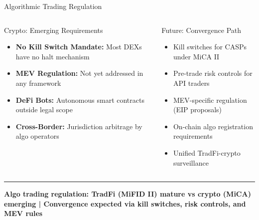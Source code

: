 \documentclass[8pt,aspectratio=169]{beamer}
\newcommand{\bottomnote}[1]{\vfill\vspace{-2mm}\textcolor{mllavender2}{\rule{\textwidth}{0.4pt}}\vspace{1mm}\footnotesize\textbf{#1}}
\begin{document}
\begin{frame}{Algorithmic Trading Regulation}
\begin{columns}[T]
\begin{block}{Crypto: Emerging Requirements}
\begin{itemize}
  \item \textbf{No Kill Switch Mandate:} Most DEXs have no halt mechanism
  \item \textbf{MEV Regulation:} Not yet addressed in any framework
  \item \textbf{DeFi Bots:} Autonomous smart contracts outside legal scope
  \item \textbf{Cross-Border:} Jurisdiction arbitrage by algo operators
\end{itemize}
\end{block}
\vspace{2mm}
\begin{block}{Future: Convergence Path}
\begin{itemize}\setlength{\itemsep}{3pt}
  \item Kill switches for CASPs under MiCA II
  \item Pre-trade risk controls for API traders
  \item MEV-specific regulation (EIP proposals)
  \item On-chain algo registration requirements
  \item Unified TradFi-crypto surveillance
\end{itemize}
\end{block}
\end{columns}
\bottomnote{Algo trading regulation: TradFi (MiFID II) mature vs crypto (MiCA) emerging | Convergence expected via kill switches, risk controls, and MEV rules}
\end{frame}
\end{document}
